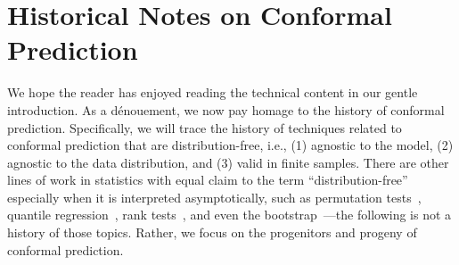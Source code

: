 \documentclass[10pt]{article}
\begin{document}
\section{Historical Notes on Conformal Prediction}
\label{sec:history}

We hope the reader has enjoyed reading the technical content in our gentle introduction.
As a d\'enouement, we now pay homage to the history of conformal prediction. Specifically, we will trace the history of techniques related to conformal prediction that are distribution-free, i.e., (1) agnostic to the model, (2) agnostic to the data distribution, and (3) valid in finite samples.
There are other lines of work in statistics with equal claim to the term ``distribution-free'' especially when it is interpreted asymptotically, such as permutation tests~\cite{chung2013exact}, quantile regression~\cite{koenker1978regression}, rank tests~\cite{mann1947test,lehmann1953power,sidak1999theory}, and even the bootstrap~\cite{efron1994introduction,chatterjee2009distribution}---the following is not a history of those topics.
Rather, we focus on the progenitors and progeny of conformal prediction.
\end{document}

